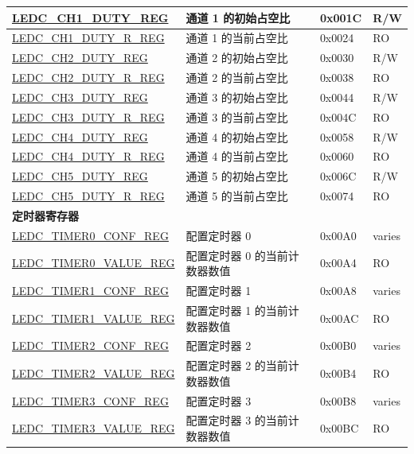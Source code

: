 \begin{longtable}{ | p{6cm} | p{7.2cm} | p{1.3cm} | p{1cm} | }
\hyperref[regdesc:LEDCCHNDUTYREG]{LEDC\_CH1\_DUTY\_REG} & 通道 1 的初始占空比 & 0x001C & R/W \\ \hline
\hyperref[regdesc:LEDCCHNDUTYRREG]{LEDC\_CH1\_DUTY\_R\_REG} & 通道 1 的当前占空比 & 0x0024 & RO \\ \hline
\hyperref[regdesc:LEDCCHNDUTYREG]{LEDC\_CH2\_DUTY\_REG} & 通道 2 的初始占空比 & 0x0030 & R/W \\ \hline
\hyperref[regdesc:LEDCCHNDUTYRREG]{LEDC\_CH2\_DUTY\_R\_REG} & 通道 2 的当前占空比 & 0x0038 & RO \\ \hline
\hyperref[regdesc:LEDCCHNDUTYREG]{LEDC\_CH3\_DUTY\_REG} & 通道 3 的初始占空比 & 0x0044 & R/W \\ \hline
\hyperref[regdesc:LEDCCHNDUTYRREG]{LEDC\_CH3\_DUTY\_R\_REG} & 通道 3 的当前占空比 & 0x004C & RO \\ \hline
\hyperref[regdesc:LEDCCHNDUTYREG]{LEDC\_CH4\_DUTY\_REG} & 通道 4 的初始占空比 & 0x0058 & R/W \\ \hline
\hyperref[regdesc:LEDCCHNDUTYRREG]{LEDC\_CH4\_DUTY\_R\_REG} & 通道 4 的当前占空比 & 0x0060 & RO \\ \hline
\hyperref[regdesc:LEDCCHNDUTYREG]{LEDC\_CH5\_DUTY\_REG} & 通道 5 的初始占空比 & 0x006C & R/W \\ \hline
\hyperref[regdesc:LEDCCHNDUTYRREG]{LEDC\_CH5\_DUTY\_R\_REG} & 通道 5 的当前占空比 & 0x0074 & RO \\ \hline
\multicolumn{4}{|l|}{\textbf{定时器寄存器}} \\ \hline
\hyperref[regdesc:LEDCTIMERXCONFREG]{LEDC\_TIMER0\_CONF\_REG} & 配置定时器 0 & 0x00A0 & varies \\ \hline
\hyperref[regdesc:LEDCTIMERXVALUEREG]{LEDC\_TIMER0\_VALUE\_REG} & 配置定时器 0 的当前计数器数值 & 0x00A4 & RO \\ \hline
\hyperref[regdesc:LEDCTIMERXCONFREG]{LEDC\_TIMER1\_CONF\_REG} & 配置定时器 1 & 0x00A8 & varies \\ \hline
\hyperref[regdesc:LEDCTIMERXVALUEREG]{LEDC\_TIMER1\_VALUE\_REG} & 配置定时器 1 的当前计数器数值 & 0x00AC & RO \\ \hline
\hyperref[regdesc:LEDCTIMERXCONFREG]{LEDC\_TIMER2\_CONF\_REG} & 配置定时器 2 & 0x00B0 & varies \\ \hline
\hyperref[regdesc:LEDCTIMERXVALUEREG]{LEDC\_TIMER2\_VALUE\_REG} & 配置定时器 2 的当前计数器数值 & 0x00B4 & RO \\ \hline
\hyperref[regdesc:LEDCTIMERXCONFREG]{LEDC\_TIMER3\_CONF\_REG} & 配置定时器 3 & 0x00B8 & varies \\ \hline
\hyperref[regdesc:LEDCTIMERXVALUEREG]{LEDC\_TIMER3\_VALUE\_REG} & 配置定时器 3 的当前计数器数值 & 0x00BC & RO \\ \hline

\end{longtable}

